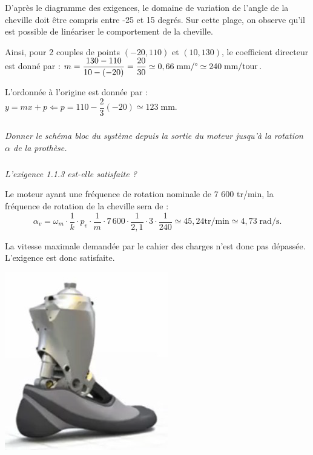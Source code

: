 \documentclass[10pt,fleqn]{article} %
\begin{document}
\ifprof
\begin{corrige}
D'après le diagramme des exigences, le domaine de variation de l'angle de la cheville doit être compris entre -25 et 15 degrés. Sur cette plage, on observe qu'il est possible de linéariser le comportement de la cheville. 

Ainsi, pour 2 couples de points $( -20,110)$ et $(10,130)$, le coefficient directeur est donné par :  $m=\dfrac{130-110}{10-(-20)} = \dfrac{20}{30}\simeq 0,66 \; \text{mm/\textdegree}\simeq 240 \; \text{mm/tour}$.
 
 L'ordonnée à l'origine est donnée par : 
 $y=m x+p \Leftarrow p = 110-\dfrac{2}{3} (-20) \simeq 123 \; \text{mm}$. 
\end{corrige}
\else
\fi


\subparagraph{}
\textit{Donner le schéma bloc du système depuis la sortie du moteur jusqu'à la rotation $\alpha$ de la prothèse.} 

\subparagraph{}
\textit{L'exigence 1.1.3 est-elle satisfaite ?}

\ifprof

\begin{corrige}

Le moteur ayant une fréquence de rotation nominale de 7 600 tr/min, la fréquence de rotation de la cheville sera de :
$$
\alpha_v = \omega_m \cdot \dfrac{1}{k}\cdot p_v \cdot \dfrac{1}{m} \cdot 
7\,600 \cdot \dfrac{1}{2,1}\cdot 3 \cdot \dfrac{1}{240} \simeq 45,24 \text{tr/min} \simeq 
4,73\; \text{rad/s}.
$$

La vitesse maximale demandée par le cahier des charges n'est donc pas dépassée. L'exigence est donc satisfaite. 
\begin{center}
\includegraphics[width=.8\textwidth]{images/prot_01}
\end{center}

\end{corrige}
\else
\fi
\end{document}
